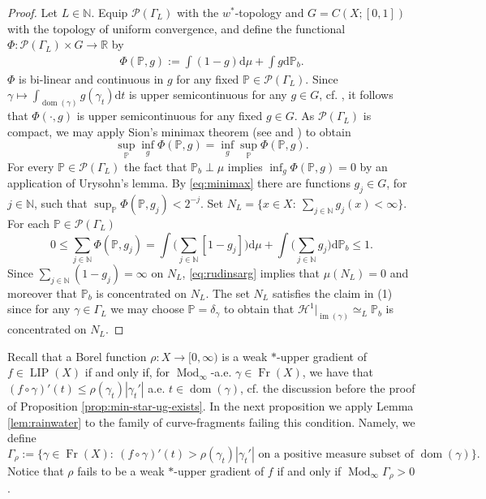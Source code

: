 \documentclass{amsart}
\numberwithin{equation}{section}
\newcommand{\R}{\mathbb{R}}
\renewcommand{\P}{\mathbb{P}}
\newcommand{\N}{\mathbb{N}}
\newcommand{\Ha}{\mathcal{H}}
\newcommand{\Mod}{\operatorname{Mod}}
\newcommand{\LIP}{\operatorname{LIP}}
\newcommand{\im}{\operatorname{im}}
\newcommand{\dom}{\operatorname{dom}}
\newcommand{\Fr}{\operatorname{Fr}}
\newcommand{\ud}{\mathrm {d}}
\begin{document}
\begin{proof}
Let $L\in \N$. Equip $\mathcal P(\Gamma_L)$ with the $w^\ast$-topology and $G=C(X;[0,1])$ with the topology of uniform convergence, and define the functional $\Phi:\mathcal P(\Gamma_L)\times G\to \R$ by
    \begin{align*}
    \Phi(\P,g):=\int(1-g)\ud\mu+\int g\ud\P_b.
    \end{align*}
 $\Phi$ is bi-linear and continuous in $g$ for any fixed $\P\in \mathcal P(\Gamma_L)$. Since $\gamma\mapsto \int_{\dom(\gamma)}g(\gamma_t)\ud t$ is upper semicontinuous for any $g\in G$, cf. \cite[Proof of Lemma 2.28]{sch16b}, it follows that $\Phi(\cdot,g)$ is upper semicontinuous for any fixed $g\in G$. As  $\mathcal P(\Gamma_L)$ is compact, we may apply Sion's minimax theorem (see \cite{sion58} and \cite[Theorem 4.7]{davideb20}) to obtain
 \begin{equation}\label{eq:minimax}
     \sup_\P\inf_g\Phi(\P,g)=\inf_g\sup_\P\Phi(\P,g).
 \end{equation}
 For every $\P\in \mathcal P(\Gamma_L)$ the fact that $\P_b\perp\mu$ implies $\displaystyle \inf_g\Phi(\P,g)=0$ by an application of Urysohn's lemma. By \eqref{eq:minimax} there are functions $g_j\in G$, for $j\in \N$, such that $\displaystyle \sup_\P\Phi(\P,g_j)<2^{-j}$. Set $N_L=\{x\in X:\ \sum_{j\in\N} g_j(x)<\infty\}$. For each $\P\in\mathcal P(\Gamma_L)$
 \begin{equation}\label{eq:rudinsarg}
0\le \sum_{j\in\N}\Phi(\P,g_j)=\int\bigg(\sum_{j\in\N}[1-g_j]\bigg)\ud\mu+\int\bigg(\sum_{j\in\N}g_j\bigg)\ud\P_b\le 1.
 \end{equation}
 Since $\sum_{j\in\N}(1-g_j)=\infty$ on $N_L$, \eqref{eq:rudinsarg} implies that $\mu(N_L)=0$ and moreover that $\P_b$ is concentrated on $N_L$. The set $N_L$ satisfies the claim in (1) since for any $\gamma\in \Gamma_L$ we may choose $\P=\delta_{\gamma}$ to obtain that $\Ha^1|_{\im(\gamma)}\simeq_L\P_b$ is concentrated on $N_L$.
\end{proof}


Recall that a Borel function $\rho:X\to [0,\infty)$ is a weak $\ast$-upper gradient of $f\in \LIP(X)$ if and only if, for $\Mod_\infty$-a.e. $\gamma\in \Fr(X)$, we have that $(f\circ\gamma)'(t)\le \rho(\gamma_t)|\gamma_t'|$ a.e. $t\in \dom(\gamma)$, cf. the discussion before the proof of Proposition \ref{prop:min-star-ug-exists}. In the next proposition we apply Lemma \ref{lem:rainwater} to the family of curve-fragments failing this condition. Namely, we define
\[
\Gamma_\rho:=\{\gamma\in\Fr(X):\ (f\circ\gamma)'(t)> \rho(\gamma_t)|\gamma_t'|\textrm{ on a positive measure subset of }\dom(\gamma)\}.
\]
Notice that $\rho$ fails to be a weak $\ast$-upper gradient of $f$ if and only if $\Mod_\infty\Gamma_\rho>0$.
\end{document}
